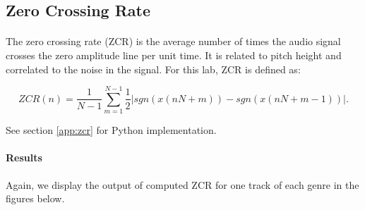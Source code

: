 \documentclass[11pt,a4paper]{article}
\begin{document}
\subsection{Zero Crossing Rate}
\paragraph*{} The zero crossing rate (ZCR) is the average number of times the audio signal crosses the zero amplitude line per unit time. It is related to pitch height and correlated to the noise in the signal. For this lab, ZCR is defined as:

\begin{equation}
ZCR(n)=\frac{1}{N-1}\sum_{m=1}^{N-1}\frac{1}{2}|sgn(x(nN+m))-sgn(x(nN+m-1))|.
\end{equation}

See section \ref{app:zcr} for Python implementation.

\paragraph{Results} Again, we display the output of computed ZCR for one track of each genre in the figures below.
\end{document}
